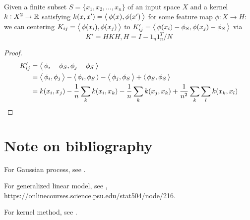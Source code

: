 \begin{refsection}
\begin{lemma}
	\cite[496]{murphy2012machine}\cite[115]{shawe2004kernel}Given a finite subset $S=\{x_1,x_2,...,x_n\}$ of an input space $X$ and a kernel $k:X^2\to \mathbb{R}$ satisfying $k(x,x')={\left< \, \phi(x),\phi(x') \, \right>}$ for some feature map $\phi:X\to H$: we can centering $K_{ij} = {\left< \, \phi(x_i),\phi(x_j) \, \right>}$ to $K'_{ij} = {\left< \, \phi(x_i) - \phi_S,\phi(x_j)-\phi_S \, \right>}$ via
	$$K' = HKH,H = I-1_n1_n^T/N$$
\end{lemma}
\begin{proof}
	\begin{align*}
	K'_{ij} &= {\left< \, \phi_i - \phi_S,\phi_j-\phi_S \, \right>} \\
	&= {\left< \, \phi_i,\phi_j \, \right>} - {\left< \, \phi_i,\phi_S \, \right>} - {\left< \, \phi_j,\phi_S \, \right>} + {\left< \, \phi_S,\phi_S \, \right>}\\
	&= k(x_i,x_j) - \frac{1}{n}\sum_k k(x_i,x_k) - \frac{1}{n} \sum_k k(x_j,x_k) + \frac{1}{n^2}\sum_k \sum_l k(x_k,x_l)
	\end{align*}	
\end{proof}


\section{Note on bibliography}

For Gaussian process, see \cite{rasmussen2006gaussian}.


For generalized linear model, see \cite{dobson2008introduction}, https://onlinecourses.science.psu.edu/stat504/node/216.


For kernel method, see \cite{shawe2004kernel}.



\end{refsection}

